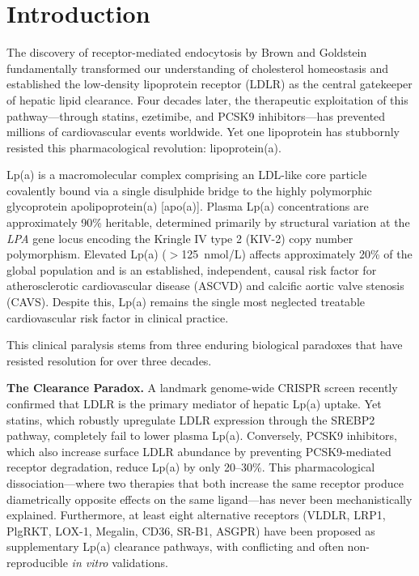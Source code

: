 \documentclass[11pt,a4paper]{article}
\newcommand{\lpa}{Lp(a)}
\begin{document}
\section*{Introduction}

The discovery of receptor-mediated endocytosis by Brown and Goldstein\cite{brown1986} fundamentally transformed our understanding of cholesterol homeostasis and established the low-density lipoprotein receptor (LDLR) as the central gatekeeper of hepatic lipid clearance. Four decades later, the therapeutic exploitation of this pathway---through statins, ezetimibe, and PCSK9 inhibitors---has prevented millions of cardiovascular events worldwide\cite{ctt2010,sabatine2017}. Yet one lipoprotein has stubbornly resisted this pharmacological revolution: lipoprotein(a).

\lpa{} is a macromolecular complex comprising an LDL-like core particle covalently bound via a single disulphide bridge to the highly polymorphic glycoprotein apolipoprotein(a) [apo(a)]\cite{berg1963,mclean1987}. Plasma \lpa{} concentrations are approximately 90\% heritable, determined primarily by structural variation at the \textit{LPA} gene locus encoding the Kringle IV type 2 (KIV-2) copy number polymorphism\cite{clarke2009,burgess2018}. Elevated \lpa{} ($>$125~nmol/L) affects approximately 20\% of the global population and is an established, independent, causal risk factor for atherosclerotic cardiovascular disease (ASCVD) and calcific aortic valve stenosis (CAVS)\cite{nordestgaard2010,arsenault2020,kamstrup2009}. Despite this, \lpa{} remains the single most neglected treatable cardiovascular risk factor in clinical practice\cite{wilson2022,tsimikas2020}.

This clinical paralysis stems from three enduring biological paradoxes that have resisted resolution for over three decades.

\textbf{The Clearance Paradox.} A landmark genome-wide CRISPR screen recently confirmed that LDLR is the primary mediator of hepatic \lpa{} uptake\cite{khan2025}. Yet statins, which robustly upregulate LDLR expression through the SREBP2 pathway, completely fail to lower plasma \lpa{}\cite{tsimikas2020statin}. Conversely, PCSK9 inhibitors, which also increase surface LDLR abundance by preventing PCSK9-mediated receptor degradation, reduce \lpa{} by only 20--30\%\cite{oconnor2015,raal2015}. This pharmacological dissociation---where two therapies that both increase the same receptor produce diametrically opposite effects on the same ligand---has never been mechanistically explained. Furthermore, at least eight alternative receptors (VLDLR, LRP1, PlgRKT, LOX-1, Megalin, CD36, SR-B1, ASGPR) have been proposed as supplementary \lpa{} clearance pathways, with conflicting and often non-reproducible \textit{in vitro} validations\cite{sharma2017,romagnuolo2015,bhatt2020,yang2019}.
\end{document}
